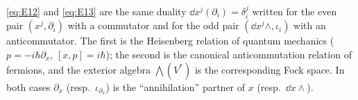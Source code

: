 \begin{remark}
\eqref{eq:E12} and \eqref{eq:E13} are the same duality $\dd x^j(\partial_i)=\delta^j_i$ written for the even pair $(x^j,\partial_i)$ with a commutator and for the odd pair $(\dd x^j\wedge,\iota_i)$ with an anticommutator.
The first is the Heisenberg relation of quantum mechanics ($p=-i\hbar\partial_x$, $[x,p]=i\hbar$); the second is the canonical anticommutation relation of fermions, and the exterior algebra $\bigwedge(V^*)$ is the corresponding Fock space.
In both cases $\partial_x$ (resp.\ $\iota_{\partial_x}$) is the ``annihilation'' partner of $x$ (resp.\ $\dd x\wedge$).
\end{remark}
